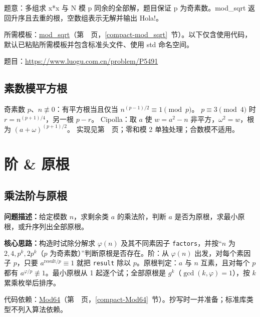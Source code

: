 \label{usage-example-42}

题意：多组求 x*x 与 N 模 p 同余的全部解，题目保证 p 为奇素数。mod\_sqrt 返回升序且去重的根，空数组表示无解并输出 Hola!。

所需模板：\hyperref[compact-mod_sqrt]{mod\_\allowbreak{}sqrt}（第~\pageref{compact-mod_sqrt}~页，\ref{compact-mod_sqrt}~节）。以下仅含使用代码，默认已粘贴所需模板并包含标准头文件、使用 std 命名空间。

题目：\url{https://www.luogu.com.cn/problem/P5491}



\subsection{素数模平方根}\label{knowledge-quadratic-residue}
奇素数 $p$、$n\not\equiv0$：有平方根当且仅当 $n^{(p-1)/2}\equiv1\pmod p$。
$p\equiv3\pmod4$ 时 $r=n^{(p+1)/4}$，另一根 $p-r$。
Cipolla：取 $a$ 使 $w=a^2-n$ 非平方，$\omega^2=w$，根为 $(a+\omega)^{(p+1)/2}$。
实现见第~\pageref{compact-mod_sqrt}~页；零和模 2 单独处理；合数模不适用。



\Needspace{180pt}

\section{阶 \& 原根}

\subsection{乘法阶与原根}\label{compact-PrimitiveRoot}

\noindent\textbf{问题描述：}\allowbreak 给定模数 $n$，求剩余类 $a$ 的乘法阶，判断 $a$ 是否为原根，求最小原根，或升序列出全部原根。

\textbf{核心思路：}\allowbreak 构造时试除分解求 $\varphi(n)$ 及其不同素因子 \texttt{factors}，并按“$n$ 为 $2,4,p^k,2p^k$（$p$ 为奇素数）”判断原根是否存在。阶：从 $\varphi(n)$ 出发，对每个素因子 $p$，只要 $a^{\mathrm{result}/p}\equiv1$ 就把 \texttt{result} 除以 $p$。原根判定：$a$ 与 $n$ 互素，且对每个 $p$ 都有 $a^{\varphi/p}\not\equiv1$。最小原根从 1 起逐个试；全部原根是 $g^k$（$\gcd(k,\varphi)=1$），按 $k$ 累乘枚举后排序。

代码依赖：\hyperref[compact-Mod64]{Mod64}（第~\pageref{compact-Mod64}~页，\ref{compact-Mod64}~节）。抄写时一并准备；标准库类型不列入算法依赖。

